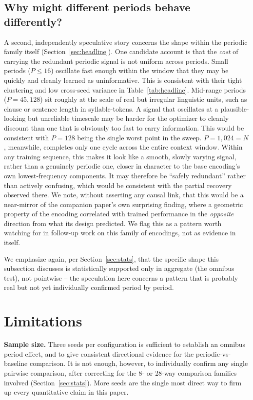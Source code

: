 \documentclass[11pt]{article}
\begin{document}
\subsection{Why might different periods behave differently?}

A second, independently speculative story concerns the shape within the periodic family itself (Section~\ref{sec:headline}). One candidate account is that the \emph{cost} of carrying the redundant periodic signal is not uniform across periods. Small periods ($P \leq 16$) oscillate fast enough within the window that they may be quickly and cleanly learned as uninformative. This is consistent with their tight clustering and low cross-seed variance in Table~\ref{tab:headline}. Mid-range periods ($P=45, 128$) sit roughly at the scale of real but irregular linguistic units, such as clause or sentence length in syllable-tokens. A signal that oscillates at a plausible-looking but unreliable timescale may be harder for the optimizer to cleanly discount than one that is obviously too fast to carry information. This would be consistent with $P=128$ being the single worst point in the sweep. $P=1{,}024=N$, meanwhile, completes only one cycle across the entire context window. Within any training sequence, this makes it look like a smooth, slowly varying signal, rather than a genuinely periodic one, closer in character to the base encoding's own lowest-frequency components. It may therefore be ``safely redundant'' rather than actively confusing, which would be consistent with the partial recovery observed there. We note, without asserting any causal link, that this would be a near-mirror of the companion paper's own surprising finding, where a geometric property of the encoding correlated with trained performance in the \emph{opposite} direction from what its design predicted. We flag this as a pattern worth watching for in follow-up work on this family of encodings, not as evidence in itself.

We emphasize again, per Section~\ref{sec:stats}, that the specific shape this subsection discusses is statistically supported only in aggregate (the omnibus test), not pointwise -- the speculation here concerns a pattern that is probably real but not yet individually confirmed period by period.

\section{Limitations}
\label{sec:limitations}

\textbf{Sample size.} Three seeds per configuration is sufficient to establish an omnibus period effect, and to give consistent directional evidence for the periodic-vs-baseline comparison. It is not enough, however, to individually confirm any single pairwise comparison, after correcting for the 8- or 28-way comparison families involved (Section~\ref{sec:stats}). More seeds are the single most direct way to firm up every quantitative claim in this paper.
\end{document}
